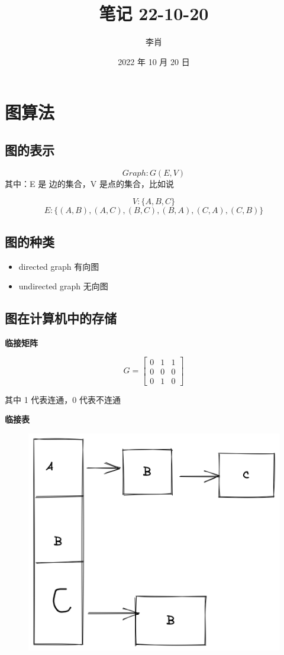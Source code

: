 \documentclass[UTF8]{ctexart}
\title{笔记 22-10-20}
\author{李肖}
\date{2022 年 10 月 20 日}
\begin{document}
\maketitle

\section{图算法}

\subsection{图的表示}
\[Graph: G(E, V)\]
其中：E 是 边的集合，V 是点的集合，比如说

\[V: \{A, B, C\}\]
\[E: \{(A, B), (A, C), (B, C), (B, A), (C, A), (C, B)\}\]

\subsection{图的种类}
\begin{itemize}
    \item directed graph 有向图
    \item undirected graph 无向图
\end{itemize}

\subsection{图在计算机中的存储}

\noindent
\textbf{临接矩阵}

\[
    G = \begin{bmatrix}
        0 & 1 & 1 \\
        0 & 0 & 0 \\
        0 & 1 & 0
    \end{bmatrix}
\]

\vskip 0.4cm
\noindent
其中 1 代表连通，0 代表不连通

\vskip 1cm
\noindent
\textbf{临接表}
\vskip 0.5cm
\begin{figure}[htbp]
    \centering
    \includegraphics[scale=0.2]{./img/list.png}
\end{figure}
\end{document}
